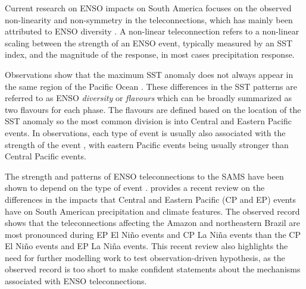   
 
  Current research on ENSO impacts on South America focuses on the observed non-linearity and non-symmetry in the teleconnections, which has mainly been attributed to ENSO diversity \citep{tedeschi2015,cai2020}.
A non-linear teleconnection refers to a non-linear scaling between the strength of an ENSO event, typically measured by an SST index, and the magnitude of the response, in most cases precipitation response. %

Observations show that the maximum SST anomaly does not always appear in the same region of the Pacific Ocean \citep{ashok2009,dommenget2013}. These differences in the SST patterns are referred to as ENSO \textit{ diversity} or \textit{flavours} which can be broadly summarized as two flavours for each phase. The flavours are defined based on the location of the SST anomaly so the most common division is into Central and Eastern Pacific events.  In observations, each type of event is usually also associated with the strength of the event \citep{dommenget2013}, with eastern Pacific events being usually stronger than Central Pacific events. 

The strength and patterns of ENSO teleconnections to the SAMS have been shown to depend on the type of event  \citep{rodrigues2011,sulca2018}. 
\cite{cai2020} provides a recent review on the differences in the impacts that Central and Eastern Pacific (CP and EP) events have on South American precipitation and climate features.
The observed record shows that the teleconnections affecting the Amazon and northeastern Brazil are most pronounced during EP El Niño events and CP La Niña events than the CP El Niño events and EP La Niña events. 
 This recent review also highlights the need for further modelling work to test observation-driven hypothesis, as the observed record is too short to make confident statements about the mechanisms associated with ENSO teleconnections.

